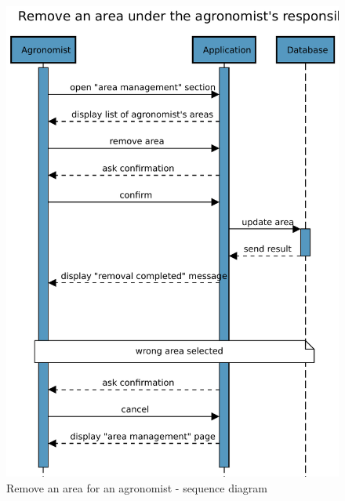 \begin{figure}[H]
    \centering
    \includegraphics[scale=0.75]{Images/Sequence diagrams/Agronomist - remove area.pdf}

    \caption{Remove an area for an agronomist - sequence diagram}
    \label{fig:fig:seq_diag_insert_area}

    
\end{figure}


